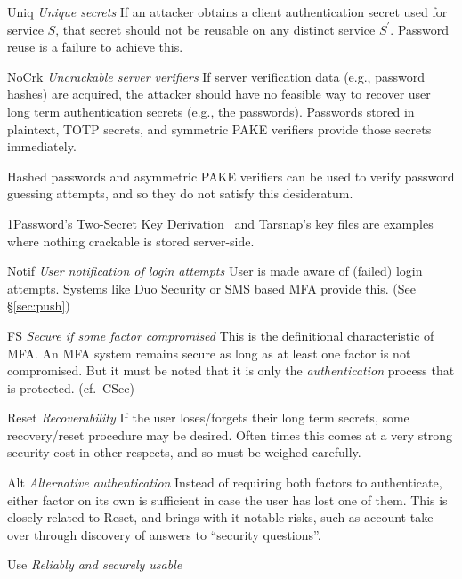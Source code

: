 \documentclass[12pt]{article}
\newcommand{\propdescription}[1]{\textit{#1}\hspace*{\fill}\linebreak }
\newcommand{\prop}[1]{\textsf{#1}}
\begin{document}
\begin{desiderata}
  \item[Uniq] \propdescription{Unique secrets}
    If an attacker obtains a client authentication secret used for service $S$, 
    that secret should not be reusable on any distinct service $S^\prime$.
    Password reuse is a failure to achieve this. 

  \item[NoCrk] \propdescription{Uncrackable server verifiers}
   If server verification data (e.g., password hashes) are acquired,
   the attacker should have no feasible way to recover user long term authentication secrets (e.g., the passwords).
   Passwords stored in plaintext, TOTP secrets, and symmetric PAKE verifiers
   provide those secrets immediately.
   
   Hashed passwords and asymmetric PAKE verifiers can be used
   to verify password guessing attempts, and so they do not satisfy this desideratum.

   1Password's Two-Secret Key Derivation~\autocite{1Password:whitepaper}
   and Tar\-snap's key files \autocite{mwlucas:tarsnap}
   are examples where nothing crackable is stored server-side.

  \item[Notif] \propdescription{User notification of login attempts}
    User is made aware of (failed) login attempts.
    Systems like Duo Security or SMS based MFA provide this.
    (See \S\ref{sec:push})

  \item[FS] \propdescription{Secure if some factor compromised}
    This is the definitional characteristic of MFA\@.
    An MFA system remains secure as long as at least one factor is not compromised.
    But it must be noted that it is only the \emph{authentication} process that is protected.
    (cf.~CSec)

  \item[Reset] \propdescription{Recoverability}
   If the user loses/forgets their long term secrets, some recovery/reset procedure may be desired. Often times this comes at a very strong security cost in other respects, and so must be weighed carefully.

  \item[Alt] \propdescription{Alternative authentication}
  Instead of requiring both factors to authenticate, either factor on its own is sufficient in case the user has lost one of them. This is closely related to  \prop{Reset}, and brings with it notable risks, such as account take-over through discovery of answers to “security questions”.

  \item[Use] \propdescription{Reliably and securely usable}

\end{desiderata}
\end{document}
